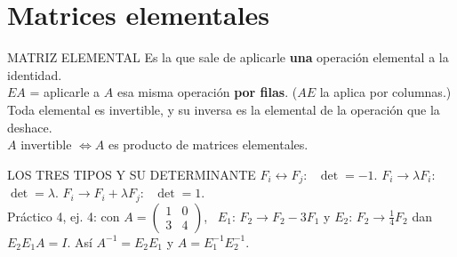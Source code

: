 \section{Matrices elementales}
\begin{sello}{MATRIZ ELEMENTAL}
Es la que sale de aplicarle \textbf{una} operación elemental a la identidad.\\[2pt]
$EA$ = aplicarle a $A$ esa misma operación \textbf{por filas}. ($AE$ la aplica por columnas.)\\[2pt]
Toda elemental es invertible, y su inversa es la elemental de la operación que la deshace.\\[2pt]
$A$ invertible $\iff A$ es producto de matrices elementales.
\end{sello}
\begin{memo}{LOS TRES TIPOS Y SU DETERMINANTE}
$F_i\leftrightarrow F_j$: \ $\det=-1$. \qquad $F_i\to\lambda F_i$: \ $\det=\lambda$. \qquad $F_i\to F_i+\lambda F_j$: \ $\det=1$.\\[2pt]
Práctico 4, ej. 4: con $A=\begin{pmatrix}1&0\\3&4\end{pmatrix}$, \ $E_1$: $F_2\to F_2-3F_1$ y $E_2$: $F_2\to\frac14F_2$ dan $E_2E_1A=I$. Así $A^{-1}=E_2E_1$ y $A=E_1^{-1}E_2^{-1}$.
\end{memo}

